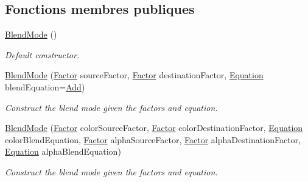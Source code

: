 \subsection*{Fonctions membres publiques}
\begin{DoxyCompactItemize}
\item 
\hyperlink{structsf_1_1BlendMode_a7faef75eae1fb47bbe93f45f38e3d345}{Blend\+Mode} ()
\begin{DoxyCompactList}\small\item\em Default constructor. \end{DoxyCompactList}\item 
\hyperlink{structsf_1_1BlendMode_a23c7452cc8e9eb943c3aea6234ce4297}{Blend\+Mode} (\hyperlink{structsf_1_1BlendMode_afb9852caf356b53bb0de460c58a9ebbb}{Factor} source\+Factor, \hyperlink{structsf_1_1BlendMode_afb9852caf356b53bb0de460c58a9ebbb}{Factor} destination\+Factor, \hyperlink{structsf_1_1BlendMode_a7bce470e2e384c4f9c8d9595faef7c32}{Equation} blend\+Equation=\hyperlink{structsf_1_1BlendMode_a7bce470e2e384c4f9c8d9595faef7c32a50c081d8f36cf7b77632966e15d38966}{Add})
\begin{DoxyCompactList}\small\item\em Construct the blend mode given the factors and equation. \end{DoxyCompactList}\item 
\hyperlink{structsf_1_1BlendMode_a69a12c596114e77126616e7e0f7d798b}{Blend\+Mode} (\hyperlink{structsf_1_1BlendMode_afb9852caf356b53bb0de460c58a9ebbb}{Factor} color\+Source\+Factor, \hyperlink{structsf_1_1BlendMode_afb9852caf356b53bb0de460c58a9ebbb}{Factor} color\+Destination\+Factor, \hyperlink{structsf_1_1BlendMode_a7bce470e2e384c4f9c8d9595faef7c32}{Equation} color\+Blend\+Equation, \hyperlink{structsf_1_1BlendMode_afb9852caf356b53bb0de460c58a9ebbb}{Factor} alpha\+Source\+Factor, \hyperlink{structsf_1_1BlendMode_afb9852caf356b53bb0de460c58a9ebbb}{Factor} alpha\+Destination\+Factor, \hyperlink{structsf_1_1BlendMode_a7bce470e2e384c4f9c8d9595faef7c32}{Equation} alpha\+Blend\+Equation)
\begin{DoxyCompactList}\small\item\em Construct the blend mode given the factors and equation. \end{DoxyCompactList}\end{DoxyCompactItemize}
